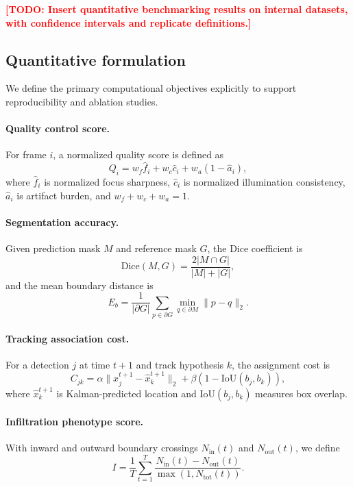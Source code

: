 \documentclass[11pt]{article}
\newcommand{\todoitem}[1]{\textcolor{red}{\textbf{[TODO: #1]}}}
\begin{document}
\noindent
\todoitem{Insert quantitative benchmarking results on internal datasets, with confidence intervals and replicate definitions.}

\subsection{Quantitative formulation}
We define the primary computational objectives explicitly to support reproducibility and ablation studies.

\paragraph{Quality control score.}
For frame $i$, a normalized quality score is defined as
\begin{equation}
Q_i = w_f \hat{f}_i + w_c \hat{c}_i + w_a (1-\hat{a}_i),
\end{equation}
where $\hat{f}_i$ is normalized focus sharpness, $\hat{c}_i$ is normalized illumination consistency, $\hat{a}_i$ is artifact burden, and $w_f + w_c + w_a = 1$.

\paragraph{Segmentation accuracy.}
Given prediction mask $M$ and reference mask $G$, the Dice coefficient is
\begin{equation}
\mathrm{Dice}(M,G)=\frac{2|M\cap G|}{|M|+|G|},
\end{equation}
and the mean boundary distance is
\begin{equation}
E_b=\frac{1}{|\partial G|}\sum_{p\in\partial G}\min_{q\in\partial M}\lVert p-q\rVert_2.
\end{equation}

\paragraph{Tracking association cost.}
For a detection $j$ at time $t+1$ and track hypothesis $k$, the assignment cost is
\begin{equation}
C_{jk}= \alpha \lVert x_j^{t+1}-\hat{x}_k^{t+1}\rVert_2 + \beta \left(1-\mathrm{IoU}(b_j,b_k)\right),
\end{equation}
where $\hat{x}_k^{t+1}$ is Kalman-predicted location and $\mathrm{IoU}(b_j,b_k)$ measures box overlap.

\paragraph{Infiltration phenotype score.}
With inward and outward boundary crossings $N_{\text{in}}(t)$ and $N_{\text{out}}(t)$, we define
\begin{equation}
I=\frac{1}{T}\sum_{t=1}^{T}\frac{N_{\text{in}}(t)-N_{\text{out}}(t)}{\max(1,N_{\text{tot}}(t))}.
\end{equation}
\end{document}
